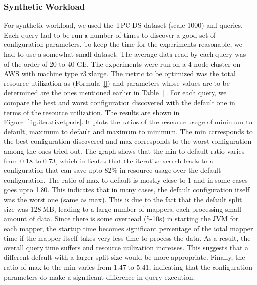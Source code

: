\subsubsection*{Synthetic Workload}
For synthetic workload, we used the TPC DS dataset (scale 1000) and queries. Each query had to be run a number of times to discover a good set of configuration parameters. To keep the time for the experiments reasonable, we had to use a somewhat small dataset. The average data read by each query was of the order of 20 to 40 GB. The experiments were run on a 4 node cluster on AWS with machine type r3.xlarge. The metric to be optimized was the total resource utilization as (Formula~\ref{}) and parameters whose values are to be determined are the ones mentioned earlier in Table~\ref{}. For each query, we compare the best and worst configuration discovered with the default one in terms of the resource utilization. The results are shown in Figure~\ref{fig:iterativetpcds}. It plots the ratios of the resource usage of minimum to default, maximum to default and maximum to minimum. The min corresponds to the best configuration discovered and max corresponds to the worst configuration among the ones tried out. The graph shows that the min to default ratio varies from 0.18 to 0.73, which indicates that the iterative search leads to a configuration that can save upto 82\% in resource usage over the default configuration. The ratio of max to default is mostly close to 1 and in some cases goes upto 1.80. This indicates that in many cases, the default configuration itself was the worst one (same as max). This is due to the fact that the default split size was 128 MB, leading to a large number of mappers, each processing small amount of data. Since there is some overhead (5-10s) in starting the JVM for each mapper, the startup time becomes significant percentage of the total mapper time if the mapper itself takes very less time to process the data. As a result, the overall query time suffers and resource utilization increases. This suggests that a different default with a larger split size would be more appropriate. Finally, the ratio of max to the min varies from 1.47 to 5.41, indicating that the configuration parameters do make a significant difference in query execution. 
